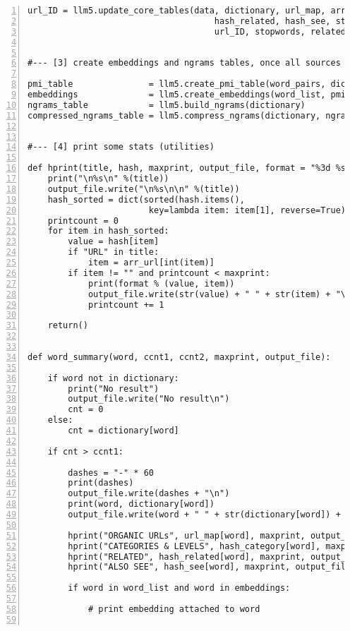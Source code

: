 \documentclass[oneside,10pt]{book}
\begin{document}
\begin{lstlisting}[numbers=left]
    url_ID = llm5.update_core_tables(data, dictionary, url_map, arr_url, hash_category, 
                                     hash_related, hash_see, stem_table, category, url, 
                                     url_ID, stopwords, related, see, word_pairs, word_list)


#--- [3] create embeddings and ngrams tables, once all sources are parsed

pmi_table               = llm5.create_pmi_table(word_pairs, dictionary)    
embeddings              = llm5.create_embeddings(word_list, pmi_table)
ngrams_table            = llm5.build_ngrams(dictionary)
compressed_ngrams_table = llm5.compress_ngrams(dictionary, ngrams_table)


#--- [4] print some stats (utilities)

def hprint(title, hash, maxprint, output_file, format = "%3d %s"):
    print("\n%s\n" %(title))
    output_file.write("\n%s\n\n" %(title))
    hash_sorted = dict(sorted(hash.items(), 
                        key=lambda item: item[1], reverse=True))
    printcount = 0
    for item in hash_sorted:
        value = hash[item]
        if "URL" in title: 
            item = arr_url[int(item)] 
        if item != "" and printcount < maxprint:
            print(format % (value, item))
            output_file.write(str(value) + " " + str(item) + "\n")
            printcount += 1

    return()


def word_summary(word, ccnt1, ccnt2, maxprint, output_file):  

    if word not in dictionary:
        print("No result")
        output_file.write("No result\n")
        cnt = 0
    else:   
        cnt = dictionary[word]

    if cnt > ccnt1:

        dashes = "-" * 60
        print(dashes)
        output_file.write(dashes + "\n")
        print(word, dictionary[word])
        output_file.write(word + " " + str(dictionary[word]) + "\n")

        hprint("ORGANIC URLs", url_map[word], maxprint, output_file)
        hprint("CATEGORIES & LEVELS", hash_category[word], maxprint, output_file) 
        hprint("RELATED", hash_related[word], maxprint, output_file)
        hprint("ALSO SEE", hash_see[word], maxprint, output_file)

        if word in word_list and word in embeddings:

            # print embedding attached to word


\end{lstlisting}
\end{document}
